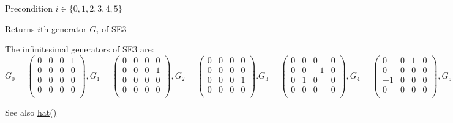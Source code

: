 \begin{DoxyPrecond}{Precondition}
$ i \in \{0,1,2,3,4,5\} $ 
\end{DoxyPrecond}
\begin{DoxyReturn}{Returns}
$ i $th generator $ G_i $ of S\+E3
\end{DoxyReturn}
The infinitesimal generators of S\+E3 are\+: \[ G_0 = \left( \begin{array}{cccc} 0& 0& 0& 1\\ 0& 0& 0& 0\\ 0& 0& 0& 0\\ 0& 0& 0& 0\\ \end{array} \right), G_1 = \left( \begin{array}{cccc} 0& 0& 0& 0\\ 0& 0& 0& 1\\ 0& 0& 0& 0\\ 0& 0& 0& 0\\ \end{array} \right), G_2 = \left( \begin{array}{cccc} 0& 0& 0& 0\\ 0& 0& 0& 0\\ 0& 0& 0& 1\\ 0& 0& 0& 0\\ \end{array} \right). G_3 = \left( \begin{array}{cccc} 0& 0& 0& 0\\ 0& 0& -1& 0\\ 0& 1& 0& 0\\ 0& 0& 0& 0\\ \end{array} \right), G_4 = \left( \begin{array}{cccc} 0& 0& 1& 0\\ 0& 0& 0& 0\\ -1& 0& 0& 0\\ 0& 0& 0& 0\\ \end{array} \right), G_5 = \left( \begin{array}{cccc} 0& -1& 0& 0\\ 1& 0& 0& 0\\ 0& 0& 0& 0\\ 0& 0& 0& 0\\ \end{array} \right). \] \begin{DoxySeeAlso}{See also}
\hyperlink{class_sophus_1_1_s_e3_group_base_a763d7ccf6abe0a5de2d460176e6c3a3a}{hat()} 
\end{DoxySeeAlso}


